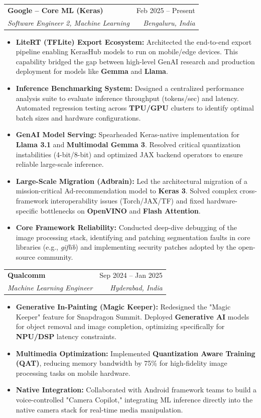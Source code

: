 \documentclass[10pt, letterpaper]{article}
\makeatletter
\newcommand{\resumeItem}[1]{
  \item\small{
    {#1 \vspace{-2pt}}
  }
}
\newcommand{\resumeSubheading}[4]{
  \vspace{-1pt}\item
    \begin{tabular*}{0.98\textwidth}[t]{l@{\extracolsep{\fill}}r}
      \textbf{#1} & {\small\color{darkgray} #2} \\
      \textit{\small#3} & \textit{\small\color{darkgray} #4} \\
    \end{tabular*}\vspace{-7pt}
}
\newcommand{\resumeItemListStart}{\begin{itemize}}
\newcommand{\resumeItemListEnd}{\end{itemize}\vspace{-5pt}}
\makeatother
\begin{document}
    \resumeSubheading
      {Google -- Core ML (Keras)}{Feb 2025 -- Present}
      {Software Engineer 2, Machine Learning}{Bengaluru, India}
      \resumeItemListStart
        \resumeItem{\textbf{LiteRT (TFLite) Export Ecosystem:} Architected the end-to-end export pipeline enabling KerasHub models to run on mobile/edge devices. This capability bridged the gap between high-level GenAI research and production deployment for models like \textbf{Gemma} and \textbf{Llama}.}
        \resumeItem{\textbf{Inference Benchmarking System:} Designed a centralized performance analysis suite to evaluate inference throughput (tokens/sec) and latency. Automated regression testing across \textbf{TPU/GPU} clusters to identify optimal batch sizes and hardware configurations.}
        \resumeItem{\textbf{GenAI Model Serving:} Spearheaded Keras-native implementation for \textbf{Llama 3.1} and \textbf{Multimodal Gemma 3}. Resolved critical quantization instabilities (4-bit/8-bit) and optimized JAX backend operators to ensure reliable large-scale inference.}
        \resumeItem{\textbf{Large-Scale Migration (Adbrain):} Led the architectural migration of a mission-critical Ad-recommendation model to \textbf{Keras 3}. Solved complex cross-framework interoperability issues (Torch/JAX/TF) and fixed hardware-specific bottlenecks on \textbf{OpenVINO} and \textbf{Flash Attention}.}
        \resumeItem{\textbf{Core Framework Reliability:} Conducted deep-dive debugging of the image processing stack, identifying and patching segmentation faults in core libraries (e.g., \textit{giflib}) and implementing security patches adopted by the open-source community.}
      \resumeItemListEnd

    \resumeSubheading
      {Qualcomm}{Sep 2024 -- Jan 2025}
      {Machine Learning Engineer}{Hyderabad, India}
      \resumeItemListStart
        \resumeItem{\textbf{Generative In-Painting (Magic Keeper):} Redesigned the "Magic Keeper" feature for Snapdragon Summit. Deployed \textbf{Generative AI} models for object removal and image completion, optimizing specifically for \textbf{NPU/DSP} latency constraints.}
        \resumeItem{\textbf{Multimedia Optimization:} Implemented \textbf{Quantization Aware Training (QAT)}, reducing memory bandwidth by 75\% for high-fidelity image processing tasks on mobile hardware.}
        \resumeItem{\textbf{Native Integration:} Collaborated with Android framework teams to build a voice-controlled "Camera Copilot," integrating ML inference directly into the native camera stack for real-time media manipulation.}
      \resumeItemListEnd
\end{document}
